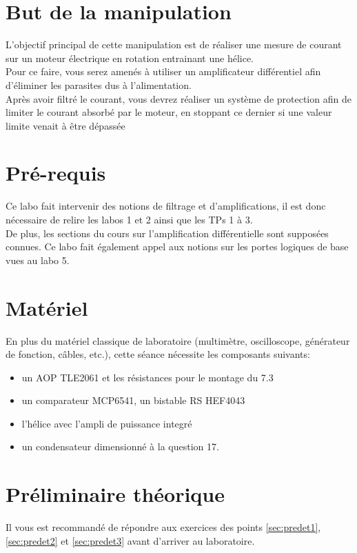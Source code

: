 \documentclass{../template/labo}
\author{The Fantastic Four} %
\begin{document}

\section{But de la manipulation}

L'objectif principal de cette manipulation est de réaliser une mesure de courant sur un moteur
électrique en rotation entrainant une hélice.\\
Pour ce faire, vous serez amenés à utiliser un amplificateur différentiel afin d'éliminer les parasites
dus à l'alimentation.\\
Après avoir filtré le courant, vous devrez réaliser un système de protection afin de limiter le courant
absorbé par le moteur, en stoppant ce dernier si une valeur limite venait à être dépassée

\section{Pré-requis}
Ce labo fait intervenir des notions de filtrage et d'amplifications, il est donc nécessaire de relire les
labos 1 et 2 ainsi que les TPs 1 à 3.\\
De plus, les sections du cours sur l'amplification différentielle sont supposées connues. Ce labo fait
également appel aux notions sur les portes logiques de base vues au labo 5.

\section{Matériel}
En plus du matériel classique de laboratoire (multimètre, oscilloscope, générateur de fonction, câbles, etc.), cette séance nécessite les composants suivants:
\begin{itemize}
\item un AOP TLE2061 et les résistances pour le montage du 7.3
\item un comparateur MCP6541, un bistable RS HEF4043
\item l'hélice avec l'ampli de puissance integré
\item un condensateur dimensionné à la question 17.
\end{itemize}

\newpage
\section{Préliminaire théorique} %
Il vous est recommandé de répondre aux exercices des points \ref{sec:predet1}, \ref{sec:predet2} et \ref{sec:predet3} avant d'arriver au
laboratoire.
\end{document}
